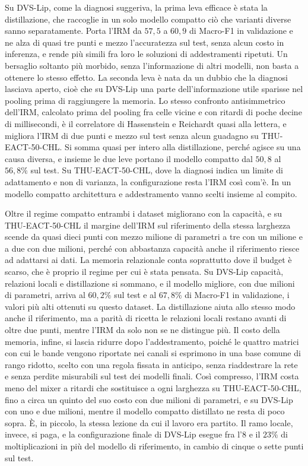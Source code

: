 Su DVS-Lip, come la diagnosi suggeriva, la prima leva efficace è stata la distillazione, che raccoglie in un solo modello compatto ciò che varianti diverse sanno separatamente. Porta l'IRM da $57{,}5$ a $60{,}9$ di Macro-F1 in validazione e ne alza di quasi tre punti e mezzo l'accuratezza sul test, senza alcun costo in inferenza, e rende più simili fra loro le soluzioni di addestramenti ripetuti. Un bersaglio soltanto più morbido, senza l'informazione di altri modelli, non basta a ottenere lo stesso effetto. La seconda leva è nata da un dubbio che la diagnosi lasciava aperto, cioè che su DVS-Lip una parte dell'informazione utile sparisse nel pooling prima di raggiungere la memoria. Lo stesso confronto antisimmetrico dell'IRM, calcolato prima del pooling fra celle vicine e con ritardi di poche decine di millisecondi, è il correlatore di Hassenstein e Reichardt quasi alla lettera, e migliora l'IRM di due punti e mezzo sul test senza alcun guadagno su THU-EACT-50-CHL. Si somma quasi per intero alla distillazione, perché agisce su una causa diversa, e insieme le due leve portano il modello compatto dal $50{,}8$ al $56{,}8\%$ sul test. Su THU-EACT-50-CHL, dove la diagnosi indica un limite di adattamento e non di varianza, la configurazione resta l'IRM così com'è. In un modello compatto architettura e addestramento vanno scelti insieme al compito.

Oltre il regime compatto entrambi i dataset migliorano con la capacità, e su THU-EACT-50-CHL il margine dell'IRM sul riferimento della stessa larghezza scende da quasi dieci punti con mezzo milione di parametri a tre con un milione e a due con due milioni, perché con abbastanza capacità anche il riferimento riesce ad adattarsi ai dati. La memoria relazionale conta soprattutto dove il budget è scarso, che è proprio il regime per cui è stata pensata. Su DVS-Lip capacità, relazioni locali e distillazione si sommano, e il modello migliore, con due milioni di parametri, arriva al $60{,}2\%$ sul test e al $67{,}8\%$ di Macro-F1 in validazione, i valori più alti ottenuti su questo dataset. La distillazione aiuta allo stesso modo anche il riferimento, ma a parità di ricetta le relazioni locali restano avanti di oltre due punti, mentre l'IRM da solo non se ne distingue più. Il costo della memoria, infine, si lascia ridurre dopo l'addestramento, poiché le quattro matrici con cui le bande vengono riportate nei canali si esprimono in una base comune di rango ridotto, scelto con una regola fissata in anticipo, senza riaddestrare la rete e senza perdite misurabili sul test dei modelli finali. Così compresso, l'IRM costa meno del mixer a ritardi che sostituisce a ogni larghezza su THU-EACT-50-CHL, fino a circa un quinto del suo costo con due milioni di parametri, e su DVS-Lip con uno e due milioni, mentre il modello compatto distillato ne resta di poco sopra. È, in piccolo, la stessa lezione da cui il lavoro era partito. Il ramo locale, invece, si paga, e la configurazione finale di DVS-Lip esegue fra l'8 e il $23\%$ di moltiplicazioni in più del modello di riferimento, in cambio di cinque o sette punti sul test.

